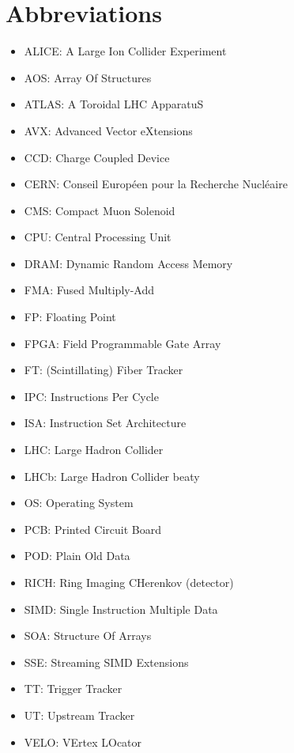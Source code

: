 \documentclass[12pt]{article}
\begin{document}
\newpage
{
	\small
	\hypersetup{linkcolor=black}
	\tableofcontents
}

{
	\small
	\hypersetup{linkcolor=black}
	\listoffigures
}

{
	\small
	\hypersetup{linkcolor=black}
	\listoftables
}



\section*{Abbreviations}

\begin{itemize}
	\item ALICE: A Large Ion Collider Experiment
	\item AOS: Array Of Structures
	\item ATLAS: A Toroidal LHC ApparatuS
	\item AVX: Advanced Vector eXtensions
	\item CCD: Charge Coupled Device
	\item CERN:  Conseil Européen pour la Recherche Nucléaire
	\item CMS: Compact Muon Solenoid
	\item CPU: Central Processing Unit
	\item DRAM: Dynamic Random Access Memory
	\item FMA: Fused Multiply-Add
	\item FP: Floating Point
	\item FPGA: Field Programmable Gate Array
	\item FT: (Scintillating) Fiber Tracker
	\item IPC: Instructions Per Cycle
	\item ISA: Instruction Set Architecture
	\item LHC: Large Hadron Collider
	\item LHCb: Large Hadron Collider beaty
	\item OS: Operating System
	\item PCB: Printed Circuit Board
	\item POD: Plain Old Data
	\item RICH: Ring Imaging CHerenkov (detector)
	\item SIMD: Single Instruction Multiple Data
	\item SOA: Structure Of Arrays
	\item SSE: Streaming SIMD Extensions 
	\item TT: Trigger Tracker
	\item UT: Upstream Tracker
	\item VELO: VErtex LOcator
\end{itemize}
\end{document}
